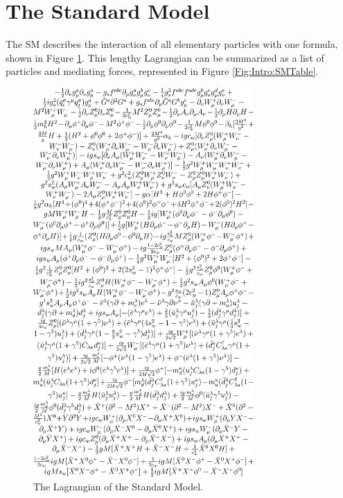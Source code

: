 \section{The Standard Model}
The SM describes the interaction of all elementary particles with one formula, shown in Figure \ref{Fig:Intro:SML}. This lengthy Lagrangian can be summarized as a list of particles and mediating forces, represented in Figure \ref{Fig:Intro:SMTable}.
\begin{figure}[h]
    \centering
        \includegraphics[width=0.75\textwidth]{F1/StandardModelEquation}
        \caption{The Lagrangian of the Standard Model.}
        \label{Fig:Intro:SML}
\end{figure}
